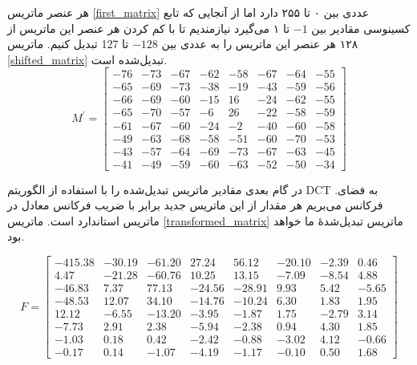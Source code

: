 هر عنصر ماتریس \ref{first_matrix} عددی بین ۰ تا ۲۵۵ دارد اما از آنجایی که تابع کسینوسی 
مقادیر بین $-1$ تا ۱ می‌گیرد نیازمندیم تا با کم کردن هر عنصر این ماتریس از 
۱۲۸ 
هر عنصر این ماتریس را به عددی بین $-128$ تا 127 تبدیل کنیم.
ماتریس   \ref{shifted_matrix} تبدیل‌شده است.
\begin{equation}    
                M^\prime = \begin{bmatrix}
                        -76 & -73 & -67 & -62 & -58 & -67 & -64 & -55\\
                        -65 & -69 & -73 & -38 & -19 & -43 & -59 & -56 \\
                        -66 & -69 & -60 & -15 & 16 & -24 & -62 & -55 \\
                        -65 & -70 & -57 & -6 & 26 & -22 & -58 & -59 \\
                        -61 & -67 & -60 & -24 & -2 & -40 & -60 & -58 \\
                        -49 & -63 & -68 & -58 & -51 & -60 & -70 & -53 \\
                        -43 & -57 & -64 & -69 & -73 & -67 & -63 & -45 \\
                        -41 & -49 & -59 & -60 & -63 & -52 & -50 & -34 
                        
                \end{bmatrix}
                \label{shifted_matrix}
\end{equation}

در گام بعدی مقادیر ماتریس تبدیل‌شده را با استفاده از الگوریتم 
DCT .به فضای فرکانس می‌بریم
هر مقدار از این ماتریس جدید برابر با ضریب فرکانس معادل در ماتریس 
استاندارد است. ماتریس \ref{transformed_matrix} ماتریس تبدیل‌شده‌ٔ ما خواهد بود.

\begin{equation}        
        F = \begin{bmatrix}
                -415.38 & -30.19 & -61.20 & 27.24 & 56.12 & -20.10 & -2.39 & 0.46\\
                4.47 & -21.28 & -60.76 & 10.25 & 13.15 & -7.09 & -8.54 & 4.88 \\
                -46.83 & 7.37 & 77.13 & -24.56 & -28.91 & 9.93 & 5.42 & -5.65 \\
                -48.53 & 12.07 & 34.10 & -14.76 & -10.24 & 6.30 & 1.83 & 1.95 \\
                12.12 & -6.55 & -13.20 & -3.95 & -1.87 & 1.75 & -2.79 & 3.14 \\
                -7.73 & 2.91 & 2.38 & -5.94 & -2.38 & 0.94 & 4.30 & 1.85 \\
                -1.03 & 0.18 & 0.42 & -2.42 & -0.88 & -3.02 & 4.12 & -0.66 \\
                -0.17 & 0.14 & -1.07 & -4.19 & -1.17 & -0.10 & 0.50 & 1.68 

        \end{bmatrix}
        \label{transformed_matrix}        
\end{equation}

